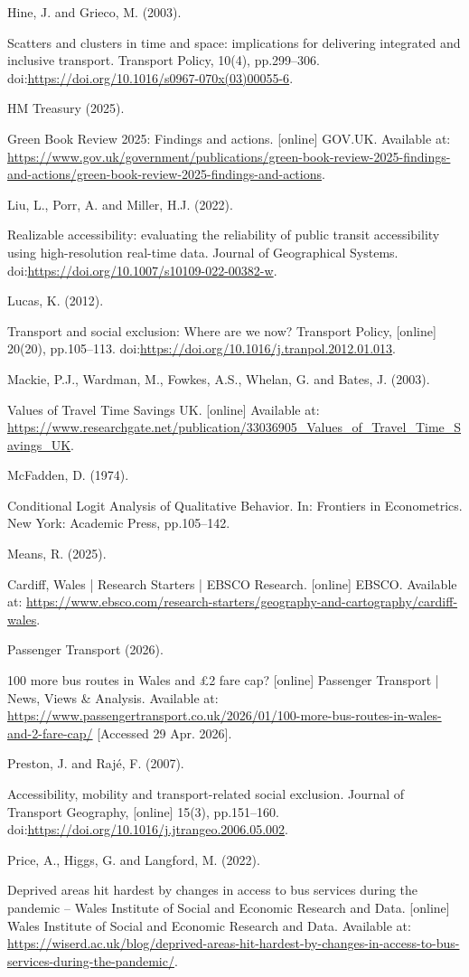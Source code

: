 \documentclass[11pt,a4paper]{article}
\begin{document}
\begin{sloppypar}
\hypertarget{hine2003}{Hine, J. and Grieco, M. (2003).} Scatters and clusters in time and space: implications for delivering integrated and inclusive transport. Transport Policy, 10(4), pp.299–306. doi:\url{https://doi.org/10.1016/s0967-070x(03)00055-6}.

\hypertarget{hmtreasury2025}{HM Treasury (2025).} Green Book Review 2025: Findings and actions. [online] GOV.UK. Available at: \url{https://www.gov.uk/government/publications/green-book-review-2025-findings-and-actions/green-book-review-2025-findings-and-actions}.

\hypertarget{liu2022}{Liu, L., Porr, A. and Miller, H.J. (2022).} Realizable accessibility: evaluating the reliability of public transit accessibility using high-resolution real-time data. Journal of Geographical Systems. doi:\url{https://doi.org/10.1007/s10109-022-00382-w}.

\hypertarget{lucas2012}{Lucas, K. (2012).} Transport and social exclusion: Where are we now? Transport Policy, [online] 20(20), pp.105–113. doi:\url{https://doi.org/10.1016/j.tranpol.2012.01.013}.

\hypertarget{mackie2003}{Mackie, P.J., Wardman, M., Fowkes, A.S., Whelan, G. and Bates, J. (2003).} Values of Travel Time Savings UK. [online] Available at: \url{https://www.researchgate.net/publication/33036905_Values_of_Travel_Time_Savings_UK}.

\hypertarget{mcfadden1974}{McFadden, D. (1974).} Conditional Logit Analysis of Qualitative Behavior. In: Frontiers in Econometrics. New York: Academic Press, pp.105–142.

\hypertarget{means2025}{Means, R. (2025).} Cardiff, Wales | Research Starters | EBSCO Research. [online] EBSCO. Available at: \url{https://www.ebsco.com/research-starters/geography-and-cartography/cardiff-wales}.

\hypertarget{passengertransport2026}{Passenger Transport (2026).} 100 more bus routes in Wales and \pounds2 fare cap? [online] Passenger Transport | News, Views \& Analysis. Available at: \url{https://www.passengertransport.co.uk/2026/01/100-more-bus-routes-in-wales-and-2-fare-cap/} [Accessed 29 Apr. 2026].

\hypertarget{preston2007}{Preston, J. and Rajé, F. (2007).} Accessibility, mobility and transport-related social exclusion. Journal of Transport Geography, [online] 15(3), pp.151–160. doi:\url{https://doi.org/10.1016/j.jtrangeo.2006.05.002}.

\hypertarget{price2022}{Price, A., Higgs, G. and Langford, M. (2022).} Deprived areas hit hardest by changes in access to bus services during the pandemic – Wales Institute of Social and Economic Research and Data. [online] Wales Institute of Social and Economic Research and Data. Available at: \url{https://wiserd.ac.uk/blog/deprived-areas-hit-hardest-by-changes-in-access-to-bus-services-during-the-pandemic/}.


\end{sloppypar}
\end{document}
